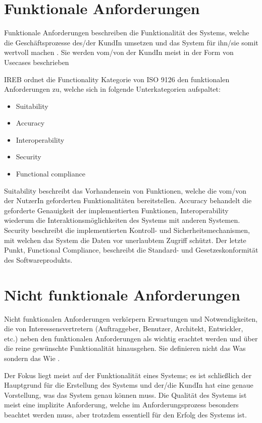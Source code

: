 \section{Funktionale Anforderungen}
Funktionale Anforderungen beschreiben die Funktionalität des Systems, welche die Geschäftsprozesse des/der KundIn umsetzen und das System für ihn/sie somit wertvoll machen \cite[S. 79]{reqanalysis}. Sie werden vom/von der KundIn meist in der Form von Usecases beschrieben \cite[S. 78]{reqanalysis}

IREB ordnet die Functionality Kategorie von ISO 9126 den funktionalen Anforderungen zu\cite[S. 9]{ireb}, welche sich in folgende Unterkategorien aufspaltet:

\begin{itemize}
  \item \glqq Suitability\grqq
  \item \glqq Accuracy\grqq
  \item \glqq Interoperability\grqq
  \item \glqq Security\grqq
  \item \glqq Functional compliance\grqq
\end{itemize}

Suitability beschreibt das Vorhandensein von Funktionen, welche die vom/von der NutzerIn geforderten Funktionalitäten bereitstellen. Accuracy behandelt die geforderte Genauigkeit der implementierten Funktionen, Interoperability wiederum die Interaktionsmöglichkeiten des Systems mit anderen Systemen. Security beschreibt die implementierten Kontroll- und Sicherheitsmechanismen, mit welchen das System die Daten vor unerlaubtem Zugriff schützt. Der letzte Punkt, Functional Compliance, beschreibt die Standard- und Gesetzeskonformität des Softwareprodukts. \cite[S. 8]{ISO_SQ}

\section{Nicht funktionale Anforderungen}
Nicht funktionalen Anforderungen \glqq verkörpern Erwartungen und Notwendigkeiten, die von Interessensvertretern (Auftraggeber, Benutzer, Architekt, Entwickler, etc.) neben den funktionalen Anforderungen als wichtig erachtet werden und über die reine gewünschte Funktionalität hinausgehen\grqq \cite[S. 108]{softarch}. Sie definieren nicht das Was sondern das Wie \cite[S. 80]{reqanalysis}.

Der Fokus liegt meist auf der Funktionalität eines Systems; es ist schließlich der Hauptgrund für die Erstellung des Systems und der/die KundIn hat eine genaue Vorstellung, was das System genau können muss. Die Qualität des Systems ist meist eine implizite Anforderung, welche im Anforderungsprozess besonders beachtet werden muss, aber trotzdem essentiell für den Erfolg des Systems ist. \cite[S. 109]{softarch}

